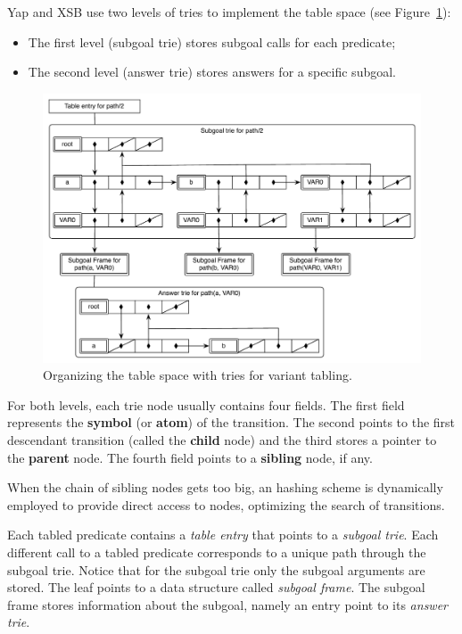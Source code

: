 Yap and XSB use two levels of tries to implement the table space (see Figure~\ref{fig:table_space_tries}):

\begin{itemize}
  \item The first level (subgoal trie) stores subgoal calls for each predicate;
  \item The second level (answer trie) stores answers for a specific subgoal.
\end{itemize}

\begin{figure}[ht]
   \centering
     \includegraphics[scale=0.6]{two_level_tries.pdf}
   \caption{Organizing the table space with tries for variant tabling.}
   \label{fig:table_space_tries}
 \end{figure}

For both levels, each trie node usually contains four fields. The first field represents the \textbf{symbol} (or \textbf{atom})
of the transition. The second points to the first descendant transition (called the \textbf{child} node)
and the third stores a pointer to the \textbf{parent} node.
The fourth field points to a \textbf{sibling} node, if any.

When the chain of sibling nodes gets too big, an hashing scheme is dynamically employed to provide direct
access to nodes, optimizing the search of transitions.

Each tabled predicate contains a \textit{table entry} that points to a \textit{subgoal trie}.
Each different call to a tabled predicate corresponds to a unique path through the subgoal trie.
Notice that for the subgoal trie only the subgoal arguments are stored.
The leaf points to a data structure called \textit{subgoal frame}. The subgoal frame stores
information about the subgoal, namely an entry point to its \textit{answer trie}.

